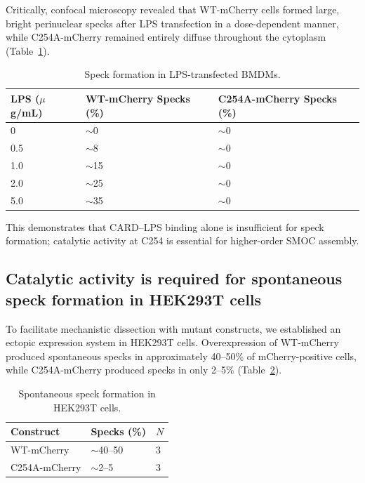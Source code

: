 \documentclass[11pt,a4paper]{article}
\begin{document}
Critically, confocal microscopy revealed that WT-mCherry cells formed large, bright perinuclear specks after LPS transfection in a dose-dependent manner, while C254A-mCherry remained entirely diffuse throughout the cytoplasm (Table~\ref{tab:bmdm_specks}).

\begin{table}[htbp]
\centering
\caption{Speck formation in LPS-transfected BMDMs.}
\label{tab:bmdm_specks}
\begin{tabular}{lll}
\toprule
\textbf{LPS ($\mu$g/mL)} & \textbf{WT-mCherry Specks (\%)} & \textbf{C254A-mCherry Specks (\%)} \\
\midrule
0 & $\sim$0 & $\sim$0 \\
0.5 & $\sim$8 & $\sim$0 \\
1.0 & $\sim$15 & $\sim$0 \\
2.0 & $\sim$25 & $\sim$0 \\
5.0 & $\sim$35 & $\sim$0 \\
\bottomrule
\end{tabular}
\end{table}

This demonstrates that CARD--LPS binding alone is insufficient for speck formation; catalytic activity at C254 is essential for higher-order SMOC assembly.

\subsection{Catalytic activity is required for spontaneous speck formation in HEK293T cells}

To facilitate mechanistic dissection with mutant constructs, we established an ectopic expression system in HEK293T cells. Overexpression of WT-mCherry produced spontaneous specks in approximately 40--50\% of mCherry-positive cells, while C254A-mCherry produced specks in only 2--5\% (Table~\ref{tab:hek_specks}).

\begin{table}[htbp]
\centering
\caption{Spontaneous speck formation in HEK293T cells.}
\label{tab:hek_specks}
\begin{tabular}{lll}
\toprule
\textbf{Construct} & \textbf{Specks (\%)} & \textbf{$N$} \\
\midrule
WT-mCherry & $\sim$40--50 & 3 \\
C254A-mCherry & $\sim$2--5 & 3 \\
\bottomrule
\end{tabular}
\end{table}
\end{document}
